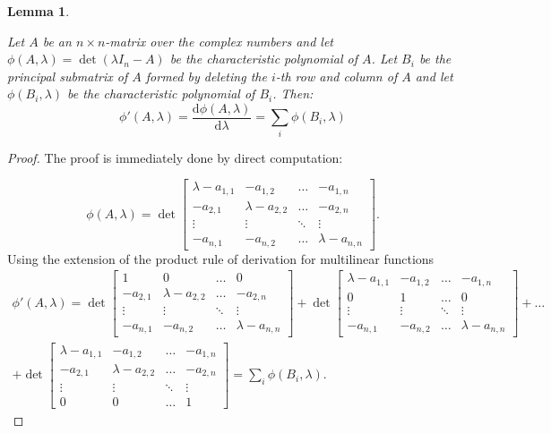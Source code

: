 \documentclass[a4paper,11pt]{report}
\newtheorem{lemma}[theorem]{Lemma}
\begin{document}
 \begin{lemma}\label{maclane}

   Let $A$ be an $n \times n$-matrix over the complex numbers and let $\phi(A, \lambda) = \det(\lambda I_n - A)$
   be the characteristic polynomial of $A$. Let $B_i$ be the principal submatrix 
   of $A$ formed by deleting the $i$-th row and column of $A$ and let $\phi(B_i, \lambda)$ 
   be the characteristic polynomial of $B_i$. Then:
   $$\phi'(A, \lambda) = \frac{\mathrm{d}\phi(A, \lambda)}{\mathrm{d}\lambda}= 
   \sum_i \phi(B_i, \lambda)$$
 \end{lemma}
\begin{proof}
  The proof is immediately done by direct computation:
  
  $$\phi(A, \lambda) = \det\begin{bmatrix} 
\lambda -a_{1,1} & -a_{1,2}  & \ldots & -a_{1,n}   \\
-a_{2,1}  & \lambda - a_{2,2} & \ldots & -a_{2,n}   \\
\vdots & \vdots & \ddots & \vdots  \\
- a_{n,1}  & -a_{n,2} & \ldots & \lambda - a_{n,n}  
\end{bmatrix}.$$
Using the extension of the product rule of derivation for multilinear functions
\begin{eqnarray*}
  \phi'(A, \lambda) = \det\begin{bmatrix} 
1 & 0  & \ldots & 0    \\
-a_{2,1}  & \lambda - a_{2,2} & \ldots & -a_{2,n}   \\
\vdots & \vdots & \ddots & \vdots  \\
- a_{n,1}  & -a_{n,2} & \ldots & \lambda - a_{n,n}  
\end{bmatrix} + 
\det\begin{bmatrix} 
\lambda -a_{1,1} & -a_{1,2}  & \ldots & -a_{1,n}   \\
0  & 1 & \ldots &  0   \\
\vdots & \vdots & \ddots & \vdots  \\
- a_{n,1}  & -a_{n,2} & \ldots & \lambda - a_{n,n}  
\end{bmatrix} + \ldots \\
+ \det\begin{bmatrix} 
\lambda -a_{1,1} & -a_{1,2}  & \ldots & -a_{1,n}   \\
-a_{2,1}  & \lambda - a_{2,2} & \ldots & -a_{2,n}   \\
\vdots & \vdots & \ddots & \vdots  \\
0  & 0 & \ldots & 1
\end{bmatrix} = \sum_i \phi(B_i, \lambda).
\end{eqnarray*}
\end{proof}
\end{document}

